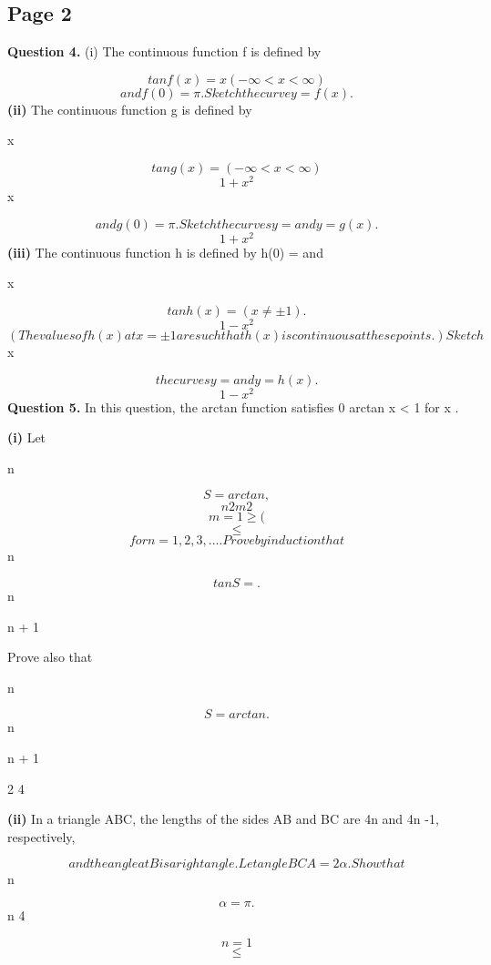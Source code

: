 \documentclass[12pt]{article}
\begin{document}
\subsection*{Page 2}
\begin{flushleft}
\bigskip\textbf{Question 4.} (i) The continuous function f is defined by\par
\[tan f(x) = x (-\infty < x < \infty)\]
\[and f(0) = \pi. Sketch the curve y = f(x) .\]
\textbf{(ii)} The continuous function g is defined by\par
x\par
\[tan g(x) = (-\infty < x < \infty)\]
\[1 + x^2\]
x\par
\[and g(0) = \pi. Sketch the curves y = and y = g(x) .\]
\[1 + x^2\]
\textbf{(iii)} The continuous function h is defined by h(0) = \pi and\par
x\par
\[tan h(x) = (x \ne ±1) .\]
\[1 - x^2\]
\[(The values of h(x) at x = ±1 are such that h(x) is continuous at these points.) Sketch\]
x\par
\[the curves y = and y = h(x).\]
\[1 - x^2\]
\bigskip\textbf{Question 5.} In this question, the arctan function satisfies 0 \geq arctan x < 1 \pi for x  .\par
\textbf{(i)} Let\par
n\par
\[S = arctan ,\]
\[n 2m2\]
\[m=1 \geq (\]
\[\leq\]
\[for n = 1, 2, 3, . . . . Prove by induction that\]
n\par
\[tan S = .\]
n\par
n + 1\par
Prove also that\par
n\par
\[S = arctan .\]
n\par
n + 1\par
2 4\par
\textbf{(ii)} In a triangle ABC, the lengths of the sides AB and BC are 4n and 4n -1, respectively,\par
\[and the angle at B is a right angle. Let angle BCA = 2α . Show that\]
n\par
\infty\par
\[α = \pi .\]
n 4\par
\[n=1\]
\[\leq\]
\end{flushleft}
\end{document}
